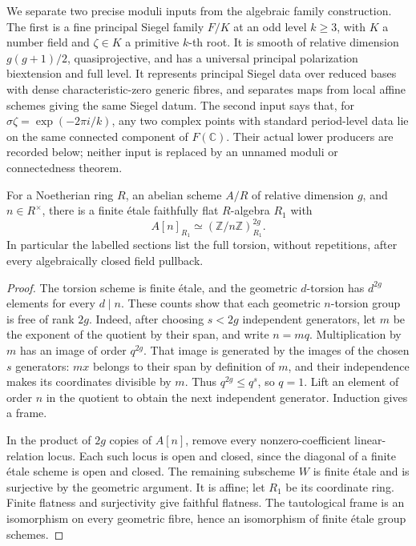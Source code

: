 We separate two precise moduli inputs from the algebraic family
construction.  The first is a fine principal Siegel family \(F/K\)
at an odd level \(k\ge3\), with \(K\) a number field and
\(\zeta\in K\) a primitive \(k\)-th root.
It is smooth of relative dimension \(g(g+1)/2\), quasiprojective,
and has a universal principal polarization biextension and full
level.  It represents principal Siegel data over reduced bases
with dense characteristic-zero generic fibres, and separates
maps from local affine schemes giving the same Siegel datum.
The second input says that, for
\(\sigma\zeta=\exp(-2\pi i/k)\), any two complex points with
standard period-level data lie on the same connected component
of \(F(\mathbb C)\).
Their actual lower producers are recorded below; neither input
is replaced by an unnamed moduli or connectedness theorem.

\begin{srlemma}
\label{lem:ftb-torsion-frame-cover}
For a Noetherian ring \(R\), an abelian scheme \(A/R\) of relative
dimension \(g\), and \(n\in R^\times\), there is a finite
\'{e}tale faithfully flat \(R\)-algebra \(R_1\) with
\[
             A[n]_{R_1}\simeq(\mathbb Z/n\mathbb Z)^{2g}_{R_1}.
\]
In particular the labelled sections list the full torsion,
without repetitions, after every algebraically closed field
pullback.
\end{srlemma}
\begin{proof}
The torsion scheme is finite \'{e}tale, and the geometric
\(d\)-torsion has \(d^{2g}\) elements for every \(d\mid n\).
These counts show that each geometric \(n\)-torsion group is
free of rank \(2g\).  Indeed, after choosing \(s<2g\) independent
generators, let \(m\) be the exponent of the quotient by their
span, and write \(n=mq\).  Multiplication by \(m\) has an image
of order \(q^{2g}\).  That image is generated by the images of
the chosen \(s\) generators: \(mx\) belongs to their span by
definition of \(m\), and their independence makes its
coordinates divisible by \(m\).
Thus \(q^{2g}\le q^s\), so \(q=1\).
Lift an element of order \(n\) in the quotient to obtain the
next independent generator.  Induction gives a frame.

In the product of \(2g\) copies of \(A[n]\), remove every
nonzero-coefficient linear-relation locus.  Each such locus
is open and closed, since the diagonal of a finite \'{e}tale
scheme is open and closed.  The remaining subscheme \(W\) is
finite \'{e}tale and is surjective by the geometric argument.
It is affine; let \(R_1\) be its coordinate ring.
Finite flatness and surjectivity give faithful flatness.
The tautological frame is an isomorphism on every geometric
fibre, hence an isomorphism of finite \'{e}tale group schemes.
\end{proof}

